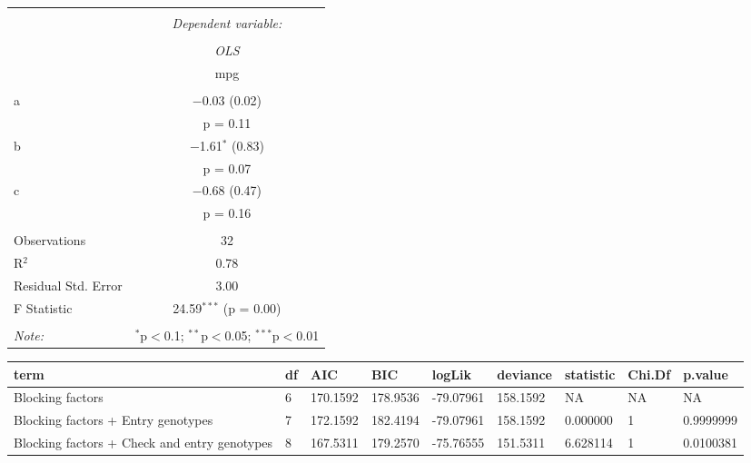 \documentclass[]{article}
\begin{document}
\begingroup  \small 

\begin{tabular}{@{\extracolsep{1pt}}lc} 
\\[-1.8ex]\hline 
\hline \\[-1.8ex] 
 & \multicolumn{1}{c}{\textit{Dependent variable:}} \\ 
\cline{2-2} 
\\[-1.8ex] & \textit{OLS} \\ 
 & mpg \\ 
\hline \\[-1.8ex] 
 a & $-$0.03 (0.02) \\ 
  & p = 0.11 \\ 
  b & $-$1.61$^{*}$ (0.83) \\ 
  & p = 0.07 \\ 
  c & $-$0.68 (0.47) \\ 
  & p = 0.16 \\ 
 \hline \\[-1.8ex] 
Observations & 32 \\ 
R$^{2}$ & 0.78 \\ 
Residual Std. Error & 3.00 \\ 
F Statistic & 24.59$^{***}$  (p = 0.00) \\ 
\hline 
\hline \\[-1.8ex] 
\textit{Note:}  & \multicolumn{1}{r}{$^{*}$p$<$0.1; $^{**}$p$<$0.05; $^{***}$p$<$0.01} \\ 
\end{tabular}

\endgroup 

\begin{table}[H]
\centering
\begin{tabular}{>{\raggedright\arraybackslash}p{2.5cm}llllllll}
\toprule
term & df & AIC & BIC & logLik & deviance & statistic & Chi.Df & p.value\\
\midrule
Blocking factors & 6 & 170.1592 & 178.9536 & -79.07961 & 158.1592 & NA & NA & NA\\
Blocking factors + Entry genotypes & 7 & 172.1592 & 182.4194 & -79.07961 & 158.1592 & 0.000000 & 1 & 0.9999999\\
Blocking factors + Check and entry genotypes & 8 & 167.5311 & 179.2570 & -75.76555 & 151.5311 & 6.628114 & 1 & 0.0100381\\
\bottomrule
\end{tabular}
\end{table}
\end{document}
